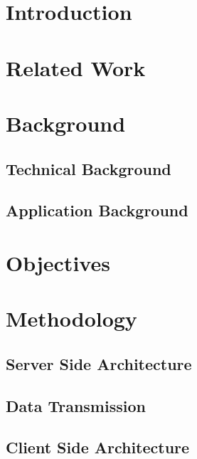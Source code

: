 \documentclass[12pt]{asu}
\begin{document}

	\chapter[Introduction]{\centering Introduction}
    	 \label{intro}

\chapter[Related Work]{\centering Related Work} \label{relwork}
			 \label{relwork}

	\chapter[Background]{\centering Background} \label{bkgrnd}
				\section{Technical Background}
				 \label{bkgrnd_technical}
				\section{Application Background}
				 \label{bkgrnd_application}

	\chapter[Objectives]{\centering Objectives} \label{objectives}
	 \label{objectives}

	\chapter[Methodology]{\centering Methodology} \label{methods}
	 \label{methods_intro}
		\section{Server Side Architecture}
		 \label{methods_server_side}
		\section{Data Transmission}
		 \label{methods_data_transmission}
		\section{Client Side Architecture}
		 \label{methods_client_side}
\end{document}
